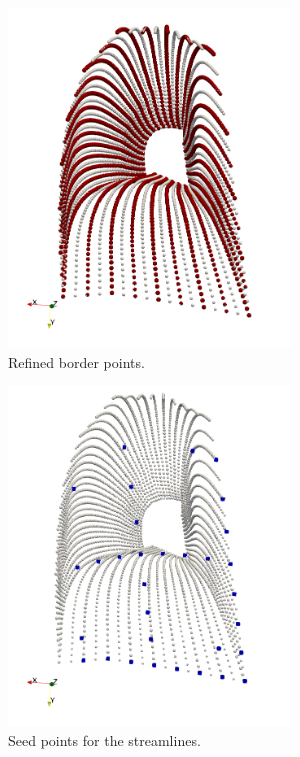 \begin{figure}%
  \centering%
  \begin{subfigure}[t]{0.45\textwidth}%
    \centering%
    \includegraphics[height=9cm]{images/parallel_fiber_estimation/02_border_points_2.png}
    \caption{Refined border points.}%
    \label{fig:02_border_points}%
  \end{subfigure}   
  \quad
  \begin{subfigure}[t]{0.45\textwidth}%
    \centering%
    \includegraphics[height=9cm]{images/parallel_fiber_estimation/03_seed_points.png}
    \caption{Seed points for the streamlines.}%
    \label{fig:03_seed_points}%
  \end{subfigure}
  \\
  \begin{subfigure}[t]{0.45\textwidth}%
    \centering%

\end{subfigure}
\end{figure}
